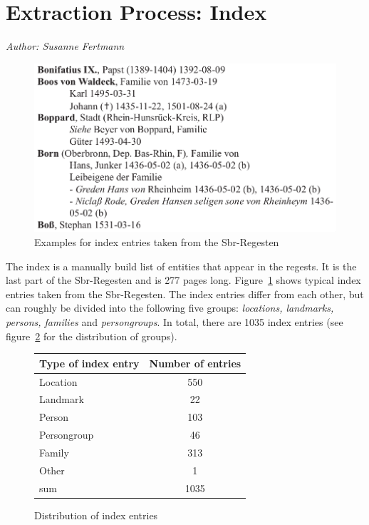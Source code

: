 \section{Extraction Process: Index}
\label{sec:index}

\emph{Author: Susanne Fertmann} \\

\begin{figure}[h]
  \centering
  \includegraphics[scale=0.3]{img/index-examples}
  \caption{Examples for index entries taken from the Sbr-Regesten}
  \label{fig:index-examples}
\end{figure}
The index is a manually build list of entities that appear in the regests. It is the last part of the Sbr-Regesten and is 277 pages long. Figure~\ref{fig:index-examples} shows typical index entries taken from the Sbr-Regesten. The index entries differ from each other, but can roughly be divided into the following five groups: \textit{locations, landmarks, persons, families} and \textit{persongroups}. In total, there are 1035 index entries (see figure~\ref{fig:type-table} for the distribution of groups). 

\begin{figure}[h]
\centering
\begin{tabular}{|l|c|}
\hline
Type of index entry & Number of entries  \\
\hline
Location            & 550 \\
Landmark            & 22  \\
Person              & 103 \\
Persongroup         & 46  \\
Family              & 313 \\
Other               & 1   \\
\hline
sum         & 1035\\
\hline
\end{tabular} 
\caption{Distribution of index entries}
\label{fig:type-table}
\end{figure}

